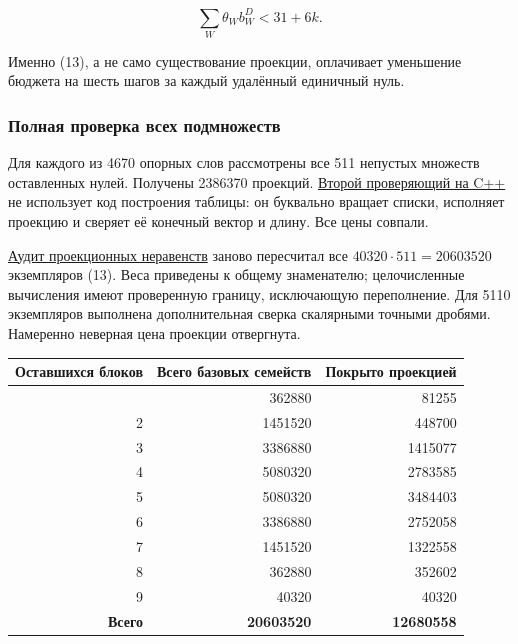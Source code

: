 \documentclass[
  11pt,
  a4paper,
]{article}
\begin{document}
\[\sum_W\theta_W b_W^D<31+6k.\tag{13}\]

Именно (13), а не само существование проекции, оплачивает уменьшение
бюджета на шесть шагов за каждый удалённый единичный нуль.

\hypertarget{ux43fux43eux43bux43dux430ux44f-ux43fux440ux43eux432ux435ux440ux43aux430-ux432ux441ux435ux445-ux43fux43eux434ux43cux43dux43eux436ux435ux441ux442ux432}{%
\subsubsection{Полная проверка всех
подмножеств}\label{ux43fux43eux43bux43dux430ux44f-ux43fux440ux43eux432ux435ux440ux43aux430-ux432ux441ux435ux445-ux43fux43eux434ux43cux43dux43eux436ux435ux441ux442ux432}}

Для каждого из 4670 опорных слов рассмотрены все 511 непустых множеств
оставленных нулей. Получены 2386370 проекций.
\href{scripts/verify_multiset_projection_table.cpp}{Второй проверяющий
на C++} не использует код построения таблицы: он буквально вращает
списки, исполняет проекцию и сверяет её конечный вектор и длину. Все
цены совпали.

\href{literature/multiset_nine_gap_projection_audit_20260924.json}{Аудит
проекционных неравенств} заново пересчитал все
\(40320\cdot511=20603520\) экземпляров (13). Веса приведены к общему
знаменателю; целочисленные вычисления имеют проверенную границу,
исключающую переполнение. Для 5110 экземпляров выполнена дополнительная
сверка скалярными точными дробями. Намеренно неверная цена проекции
отвергнута.

\begin{longtable}[]{@{}rrr@{}}
\toprule\noalign{}
Оставшихся блоков & Всего базовых семейств & Покрыто проекцией \\
\midrule\noalign{}
\endhead
\bottomrule\noalign{}
\endlastfoot
1 & 362880 & 81255 \\
2 & 1451520 & 448700 \\
3 & 3386880 & 1415077 \\
4 & 5080320 & 2783585 \\
5 & 5080320 & 3484403 \\
6 & 3386880 & 2752058 \\
7 & 1451520 & 1322558 \\
8 & 362880 & 352602 \\
9 & 40320 & 40320 \\
\textbf{Всего} & \textbf{20603520} & \textbf{12680558} \\
\end{longtable}
\end{document}
